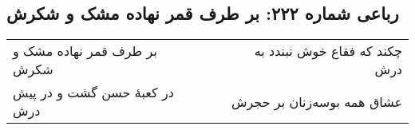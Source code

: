 \begin{center}
\section*{رباعی شماره ۲۲۲: بر طرف قمر نهاده مشک و شکرش}
\label{sec:sh222}
\begin{longtable}{l p{0.5cm} r}
بر طرف قمر نهاده مشک و شکرش
&&
چکند که فقاع خوش نبندد به درش
\\
در کعبهٔ حسن گشت و در پیش درش
&&
عشاق همه بوسه‌زنان بر حجرش
\\
\end{longtable}
\end{center}
